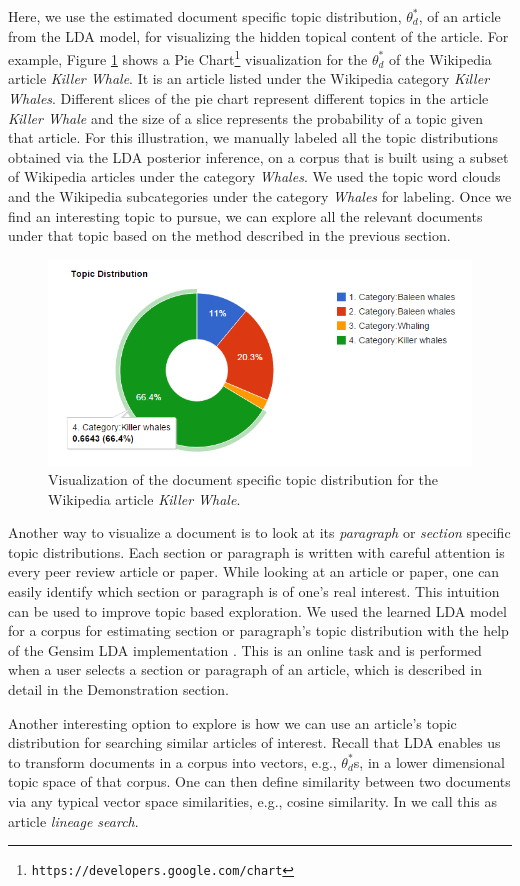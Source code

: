 Here, we use the estimated document specific topic distribution, 
$\theta^*_{d}$, of an article from the LDA model, for visualizing 
the hidden topical content of the article. For example, Figure
\ref{fig:doc-topic-distribution} shows a Pie 
Chart\footnote{\texttt{https://developers.google.com/chart}} 
visualization for 
the $\theta^*_{d}$ of the Wikipedia article \textit{Killer Whale}.
It is an article listed under the Wikipedia category          
\textit{Killer Whales}. Different slices of the pie chart represent
different topics in the article \textit{Killer Whale} and the size 
of a slice represents the probability of a topic given that article. 
For this illustration, we manually labeled all the topic 
distributions obtained via the LDA posterior inference, on a 
corpus that is built using a subset of Wikipedia articles under the 
category \textit{Whales}. We used the topic word clouds 
and the Wikipedia subcategories under the category \textit{Whales} 
for labeling. Once we find an interesting topic to pursue, we can 
explore all the relevant documents under that topic based on the 
method described in the previous section. 

\begin{figure}[htb]\centering 
\includegraphics[width=.45\textwidth]{images/doc_topic_distribution.png}
\caption{Visualization of the document specific topic distribution 
for the Wikipedia article \textit{Killer Whale}.}
\label{fig:doc-topic-distribution}
\end{figure}

Another way to visualize a document is to look at its 
\textsl{paragraph} or \textsl{section} specific topic distributions. 
Each section or paragraph is written with careful attention is every 
peer review article or paper. While looking at an article or paper,  
one can easily identify which section or paragraph is of one's real 
interest. This intuition can be used to improve topic based 
exploration. We used the learned LDA model for a corpus for 
estimating section or paragraph's topic distribution with the help 
of the Gensim LDA implementation \cite{rehurek_lrec}. This is an 
online task and is performed when a user selects a section or 
paragraph of an article, which is described in detail in the \system 
Demonstration section.  


Another interesting option to explore is how we can use an article's 
topic distribution for searching similar articles of interest. 
Recall that LDA enables us to transform documents in a corpus into 
vectors, e.g., $\theta^*_{d}$s, in a lower dimensional topic space 
of that corpus. One can then define similarity between two documents 
via any typical vector space similarities, e.g., cosine similarity. 
In \system we call this as article \textsl{lineage search}.         

